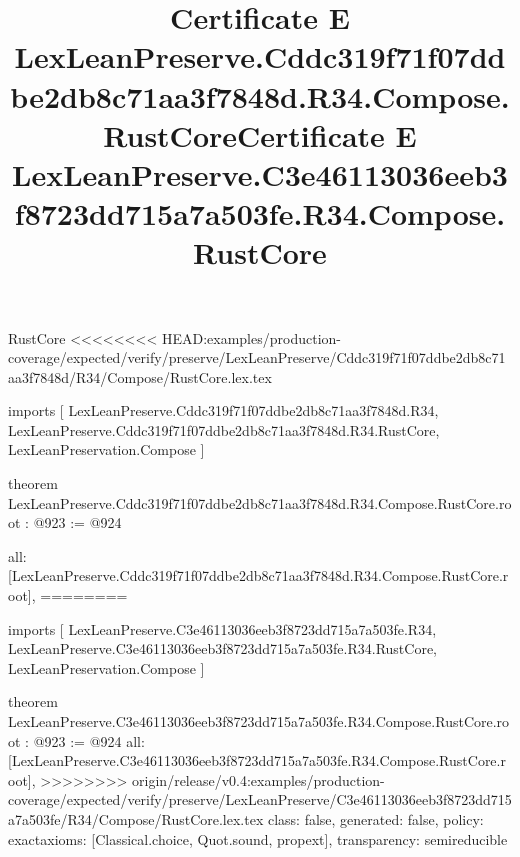 \begin{lexlean}{RustCore}
<<<<<<<< HEAD:examples/production-coverage/expected/verify/preserve/LexLeanPreserve/Cddc319f71f07ddbe2db8c71aa3f7848d/R34/Compose/RustCore.lex.tex
\title{Certificate E LexLeanPreserve.Cddc319f71f07ddbe2db8c71aa3f7848d.R34.Compose.RustCore}
\begin{coremodule}
imports [
  LexLeanPreserve.Cddc319f71f07ddbe2db8c71aa3f7848d.R34,
  LexLeanPreserve.Cddc319f71f07ddbe2db8c71aa3f7848d.R34.RustCore,
  LexLeanPreservation.Compose
]

theorem LexLeanPreserve.Cddc319f71f07ddbe2db8c71aa3f7848d.R34.Compose.RustCore.root : @923 := @924 {
  all: [LexLeanPreserve.Cddc319f71f07ddbe2db8c71aa3f7848d.R34.Compose.RustCore.root],
========
\title{Certificate E LexLeanPreserve.C3e46113036eeb3f8723dd715a7a503fe.R34.Compose.RustCore}
\begin{coremodule}
imports [
  LexLeanPreserve.C3e46113036eeb3f8723dd715a7a503fe.R34,
  LexLeanPreserve.C3e46113036eeb3f8723dd715a7a503fe.R34.RustCore,
  LexLeanPreservation.Compose
]

theorem LexLeanPreserve.C3e46113036eeb3f8723dd715a7a503fe.R34.Compose.RustCore.root : @923 := @924 {
  all: [LexLeanPreserve.C3e46113036eeb3f8723dd715a7a503fe.R34.Compose.RustCore.root],
>>>>>>>> origin/release/v0.4:examples/production-coverage/expected/verify/preserve/LexLeanPreserve/C3e46113036eeb3f8723dd715a7a503fe/R34/Compose/RustCore.lex.tex
  class: false,
  generated: false,
  policy: exact{axioms: [Classical.choice, Quot.sound, propext]},
  transparency: semireducible
}


\end{coremodule}}
\end{coremodule}
\end{lexlean}
